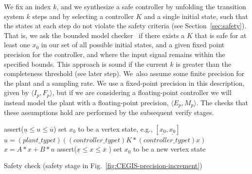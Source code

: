 We fix an index $k$, 
and we synthesize a safe controller by
unfolding the transition system $k$ steps and by selecting a controller $K$ and a single initial state, 
such that the states at each step do not violate the safety criteria (see Section~\ref{sec:safety}).    
That is, we ask the bounded model checker~\cite{ClarkeKL04} if there exists a $K$ that is safe for at least one $x_0$ in our set of all possible initial states, and a given fixed point precision for the controller, and where the input signal remains within the specified bounds.
This approach is sound if the current $k$ is greater than the completeness threshold (see later step).  
We~also assume some finite precision for the plant and a sampling rate. We use a fixed-point precision in this description, given by $\langle I_p,F_p\rangle$, but if we are considering a floating-point controller we will instead model the plant with a floating-point precision, $\langle E_p,M_p\rangle$.
The checks that these assumptions hold are performed by the subsequent {\sc verify} stages. 




\begin{algorithm}[]
\begin{algorithmic}[1]
\State assert($ \underline{u}  \leq u \leq \overline{u}$)
 \State set $x_0$ to be a vertex state, e.g., $[\underline{x_0},\underline{x_0}]$	
		\State $u = (plant\_typet)((controller\_typet)K * (controller\_typet) x)$
		\State $x = A * x + B * u$
		\State assert($\underline{x} \leq x \leq \overline{x}$ )
  	\EndFor
  	\State set $x_0$ to be a new vertex state
  	\EndFor
\EndFunction
\end{algorithmic}
\caption{Safety check ({\sc safety} stage in Fig.~\ref{fig:CEGIS-precision-increment})\label{alg:safetycheck}}
\end{algorithm}


